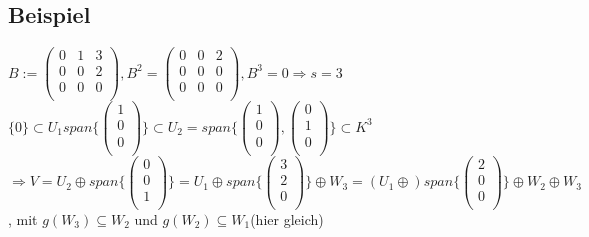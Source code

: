 \documentclass[a4paper, 12pt]{extarticle}
\begin{document}
\subsection*{Beispiel}
$B := \left( \begin{matrix}
0 & 1 & 3 \\
0 & 0 & 2 \\
0 & 0 & 0 \\
\end{matrix} \right),
B^2 = \left(\begin{matrix}
0 & 0 & 2 \\
0 & 0 & 0 \\
0 & 0 & 0 \\
\end{matrix}\right),
B^3 = 0 \Rightarrow s=3$ \\
$\{0\} \subset U_1 span\{ \left( \begin{matrix}
1 \\
0 \\
0 \\
\end{matrix}\right) \} \subset U_2 = span\{ \left(\begin{matrix}
1\\
0\\
0\\

\end{matrix}\right) , \left( 
\begin{matrix}
0\\
1\\
0\\
\end{matrix}\right) \} \subset K^3$\\
$\Rightarrow V = U_2 \oplus span\{ \left(\begin{matrix}
0\\
0\\
1\\
\end{matrix}\right)\} = U_1 \oplus span\{ \left(\begin{matrix}
3\\
2\\
0\\
\end{matrix}\right)\} \oplus W_3 = (U_1 \oplus) span\{\left(\begin{matrix}
2\\
0\\
0\\
\end{matrix}\right)\} \oplus W_2 \oplus W_3$, mit $g(W_3) \subseteq W_2$ und $g(W_2) \subseteq W_1$(hier gleich)\\
\end{document}

